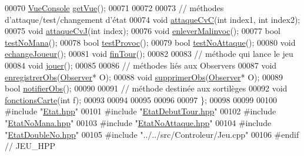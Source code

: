 \begin{DoxyCode}
00070         \hyperlink{class_vue_console}{VueConsole} \hyperlink{class_jeu_a6a98e2284176a68e9096a331d7da75e7}{getVue}();
00071 
00072         
00073         \textcolor{comment}{// méthodes d'attaque/test/changement d'état }
00074         \textcolor{keywordtype}{void} \hyperlink{class_jeu_a86087ecade936bff6bad82eb024ba6bf}{attaqueCvC}(\textcolor{keywordtype}{int} index1, \textcolor{keywordtype}{int} index2);
00075         \textcolor{keywordtype}{void} \hyperlink{class_jeu_a81b8b7bc79f9df1b1f3c557e04e8c634}{attaqueCvJ}(\textcolor{keywordtype}{int} index);
00076         \textcolor{keywordtype}{void} \hyperlink{class_jeu_a43c11cf6d659b78dd957cfa65d6d5547}{enleverMalinvoc}();
00077         \textcolor{keywordtype}{bool} \hyperlink{class_jeu_abbbc59a98fe8296456ddc112faa2b66b}{testNoMana}();
00078         \textcolor{keywordtype}{bool} \hyperlink{class_jeu_a391aae052833ebc367a660f4d3a7df29}{testProvoc}();
00079         \textcolor{keywordtype}{bool} \hyperlink{class_jeu_a2613ca19004343323262ca2b0d55ca33}{testNoAttaque}();
00080         \textcolor{keywordtype}{void} \hyperlink{class_jeu_a2952107f355b2d0c53bfc2a048c17705}{echangeJoueur}(); 
00081         \textcolor{keywordtype}{void} \hyperlink{class_jeu_a042628965e72acf7d4d498aa88f32f1f}{finTour}();
00082 
00083         \textcolor{comment}{// méthode qui lance le jeu }
00084         \textcolor{keywordtype}{void} \hyperlink{class_jeu_a23aa7effc82b36e177013394ee74421e}{jouer}();
00085 
00086         \textcolor{comment}{// méthodes liés aux Observers}
00087         \textcolor{keywordtype}{void} \hyperlink{class_jeu_a88bf8ed9150f780b02e70decc60a3f02}{enregistrerObs}(\hyperlink{class_observer}{Observer}* O);
00088         \textcolor{keywordtype}{void} \hyperlink{class_jeu_a8a051ac409a0e53397df3d4578a1e571}{supprimerObs}(\hyperlink{class_observer}{Observer}* O);
00089         \textcolor{keywordtype}{bool} \hyperlink{class_jeu_acd9b7a2de81b5ca7d2a5c3b7e5e177e2}{notifierObs}();
00090 
00091         \textcolor{comment}{// méthode destinée aux sortilèges}
00092         \textcolor{keywordtype}{void} \hyperlink{class_jeu_a97de7b353912bf1754c33c41ea753790}{fonctionsCarte}(\textcolor{keywordtype}{int} f);
00093         
00094         
00095         
00096         
00097 \};
00098 
00099 
00100 \textcolor{preprocessor}{#include "\hyperlink{_etat_8hpp}{Etat.hpp}"}
00101 \textcolor{preprocessor}{#include "\hyperlink{_etat_debut_tour_8hpp}{EtatDebutTour.hpp}"}
00102 \textcolor{preprocessor}{#include "\hyperlink{_etat_no_mana_8hpp}{EtatNoMana.hpp}"}
00103 \textcolor{preprocessor}{#include "\hyperlink{_etat_no_attaque_8hpp}{EtatNoAttaque.hpp}"}
00104 \textcolor{preprocessor}{#include "\hyperlink{_etat_double_no_8hpp}{EtatDoubleNo.hpp}"}
00105 \textcolor{preprocessor}{#include "../../src/Controleur/Jeu.cpp"}
00106 \textcolor{preprocessor}{#endif // JEU\_HPP       }
\end{DoxyCode}
